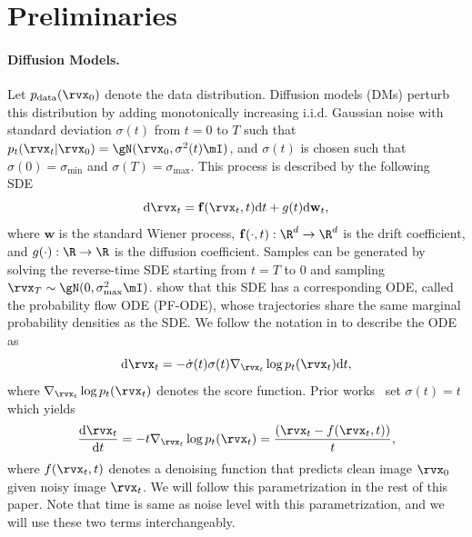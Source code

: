 \documentclass{article}
\begin{document}
\section{Preliminaries}\label{sec:preliminaries}

\paragraph{Diffusion Models.} Let $p_{\text{data}}(\rvx_0)$ denote the data distribution. Diffusion models (DMs) perturb this distribution by adding monotonically increasing i.i.d. Gaussian noise with standard deviation $\sigma(t)$ from $t=0$ to $T$ such that $p_t(\rvx_t | \rvx_0) = \gN(\rvx_0, \sigma^2(t)\mI)$, and $\sigma(t)$ is chosen such that $\sigma(0) = \sigma_{\text{min}}$ and $\sigma(T) = \sigma_{\text{max}}$.
This process is described by the following SDE~\citep{scoresde}
\begin{equation}
    \d \rvx_t = \mathbf{f}(\rvx_t, t) \d t + g(t) \d \mathbf{w}_t \label{eqn:ito-sde},
\end{equation}
where $\mathbf{w}$ is the standard Wiener process, $\mathbf{f}(\cdot, t): \R^d \rightarrow \R^d$ is the drift coefficient, and $g(\cdot): \R \rightarrow \R$  is the diffusion coefficient. 
Samples can be generated by solving the reverse-time SDE starting from $t=T$ to $0$ and sampling $\rvx_T \sim \gN(0, \sigma^2_\text{max}\mI)$.
\citep{scoresde} show that this SDE has a corresponding ODE, called the probability flow ODE (PF-ODE), whose trajectories share the same marginal probability densities as the SDE. We follow the notation in \citep{Karras2022edm} to describe the ODE as
\begin{equation}
    \d\rvx_t = -\dot{\sigma}(t) \sigma(t) \nabla_{\rvx_t} \log p_t(\rvx_t)\d t,
\end{equation}
where $\nabla_{\rvx_t} \log p_t(\rvx_t)$ denotes the score function. Prior works~\citep{Karras2022edm,cm} set $\sigma(t) = t$ which yields
\begin{equation}
    \dfrac{\d \rvx_t}{\d t} =  -t \nabla_{\rvx_t} \log p_t(\rvx_t) = \dfrac{(\rvx_t - f(\rvx_t,t))}{t},\label{eq:karras-ode}
\end{equation}
where $f(\rvx_t,t)$ denotes a denoising function that predicts clean image $\rvx_0$ given noisy image $\rvx_t$. We will follow this parametrization in the rest of this paper. Note that time is same as noise level with this parametrization, and we will use these two terms interchangeably.
\end{document}
